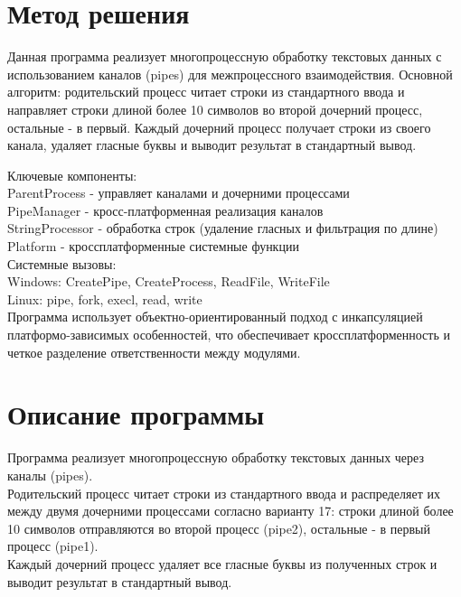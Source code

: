 \section{Метод решения}
Данная программа реализует многопроцессную обработку текстовых данных с использованием каналов (pipes) для межпроцессного взаимодействия.
Основной алгоритм: родительский процесс читает строки из стандартного ввода и направляет строки длиной более 10 символов во второй дочерний процесс, остальные - в первый. Каждый дочерний процесс получает строки из своего канала, удаляет гласные буквы и выводит результат в стандартный вывод.

Ключевые компоненты:\\
ParentProcess - управляет каналами и дочерними процессами\\
PipeManager - кросс-платформенная реализация каналов\\
StringProcessor - обработка строк (удаление гласных и фильтрация по длине)\\
Platform - кроссплатформенные системные функции\\

Системные вызовы:\\
Windows: CreatePipe, CreateProcess, ReadFile, WriteFile\\
Linux: pipe, fork, execl, read, write\\

Программа использует объектно-ориентированный подход с инкапсуляцией платформо-зависимых особенностей, что обеспечивает кроссплатформенность и четкое разделение ответственности между модулями.

\section{Описание программы}
Программа реализует многопроцессную обработку текстовых данных через каналы (pipes). \\
Родительский процесс читает строки из стандартного ввода и распределяет их между двумя дочерними процессами согласно варианту 17: строки длиной более 10 символов отправляются во второй процесс (pipe2), остальные - в первый процесс (pipe1). \\
Каждый дочерний процесс удаляет все гласные буквы из полученных строк и выводит результат в стандартный вывод.\\

